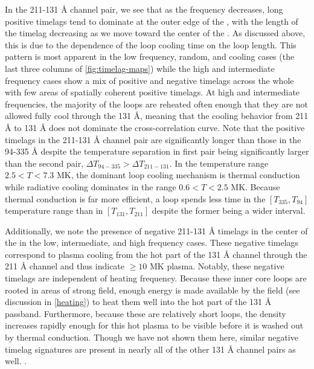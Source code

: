 In the 211-131 \AA{} channel pair, we see that as the frequency decreases, long positive timelags tend to dominate at the outer edge of the \AR{}, with the length of the timelag decreasing as we move toward the center of the \AR{}. As discussed above, this is due to the dependence of the loop cooling time on the loop length. This pattern is most apparent in the low frequency, random, and cooling cases (the last three columns of \autoref{fig:timelag-maps}) while the high and intermediate frequency cases show a mix of positive and negative timelags across the whole \AR{} with few areas of spatially coherent positive timelags. At high and intermediate frequencies, the majority of the loops are reheated often enough that they are not allowed fully cool through the 131 \AA{}, meaning that the cooling behavior from 211 \AA{} to 131 \AA{} does not dominate the cross-correlation curve. Note that the positive timelags in the 211-131 \AA{} channel pair are significantly longer than those in the 94-335 \AA{} despite the temperature separation in first pair being significantly larger than the second pair, $\Delta T_{94-335}>\Delta T_{211-131}$. In the temperature range $2.5<T<7.3$ MK, the dominant loop cooling mechanism is thermal conduction while radiative cooling dominates in the range $0.6<T<2.5$ MK. Because thermal conduction is far more efficient, a loop spends less time in the $[T_{335},T_{94}]$ temperature range than in $[T_{131},T_{211}]$ despite the former being a wider interval.

Additionally, we note the presence of negative 211-131 \AA{} timelags in the center of the \AR{} in the low, intermediate, and high frequency cases. These negative timelags correspond to plasma cooling from the hot part of the 131 \AA{} channel through the 211 \AA{} channel and thus indicate  $\ge10$ MK plasma. Notably, these negative timelags are independent of heating frequency. Because these inner core loops are rooted in areas of strong field, enough energy is made available by the field (see discussion in \autoref{heating}) to heat them well into the hot part of the 131 \AA{} passband. Furthermore, because these are relatively short loops, the density increases rapidly enough for this hot plasma to be visible before it is washed out by thermal conduction. Though we have not shown them here, similar negative timelag signatures are present in nearly all of the other 131 \AA{} channel pairs as well. .


